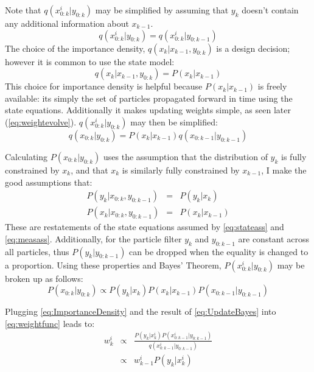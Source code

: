 \documentclass[journal]{./IEEEtran}
\begin{document}
Note that $q(x^i_{0:k} | y_{0:k})$ may be simplified by assuming that 
$y_k$ doesn't contain any additional information about $x_{k-1}$. 
\begin{equation}
q(x^i_{0:k} | y_{0:k}) = q(x^i_{0:k} | y_{0:k-1})
\label{eq:QAssump}
\end{equation}
The choice of the importance density, $q(x_k | x_{k-1}, y_{0:k})$ is 
a design decision; however it is common to use the state model: 
\begin{equation}
q(x_k | x_{k-1}, y_{0:k}) =  P(x_k | x_{k-1})
\label{eq:ImportanceDensity}
\end{equation}
This choice for importance density is helpful because 
$P(x_k | x_{k-1})$ is freely available: its simply the set 
of particles propagated forward in time using the state 
equations. Additionally it makes
updating weights simple, as seen later (\autoref{eq:weightevolve}).
$q(x^i_{0:k} | y_{0:k})$ may then be simplified:
\begin{equation}
q(x_{0:k} | y_{0:k}) = P(x_k | x_{k-1})q(x_{0:k-1} | y_{0:k-1})  
\label{eq:Support}
\end{equation}

Calculating $P(x_{0:k} | y_{0:k})$ 
uses the assumption that the distribution of $y_k$ is 
fully constrained by $x_k$, and that $x_k$ is similarly fully 
constrained by $x_{k-1}$, I make the good assumptions that:
\begin{eqnarray}
P(y_k | x_{0:k}, y_{0:k-1}) &=& P(y_k | x_k) \nonumber \\
P(x_k | x_{0:k}, y_{0:k-1}) &=& P(x_k | x_{k-1})
\label{eq:MarkovProperty}
\end{eqnarray}
These are restatements of the state equations assumed by \autoref{eq:stateass}
and \autoref{eq:measass}.
Additionally, for the particle filter $y_k$ and $y_{0:k-1}$ are 
constant across all particles, thus $P(y_k| y_{0:k-1})$ can
be dropped when the equality is changed to a proportion. 
Using these properties and Bayes' Theorem, $P(x^i_{0:k} | y_{0:k})$ 
may be broken up as follows:
\begin{equation}
P(x_{0:k} | y_{0:k}) \propto P(y_k| x_k) P(x_k | x_{k-1}) P(x_{0:k-1} | y_{0:k-1}) 
 \label{eq:UpdateBayes}
\end{equation}

Plugging \autoref{eq:ImportanceDensity} and the result of \autoref{eq:UpdateBayes}
into \autoref{eq:weightfunc} leads to:
\begin{eqnarray}
w^i_k & \propto & \frac{P(y_k| x^i_k)  P(x^i_{0:k-1} | y_{0:k-1})}
                         {q(x^i_{0:k-1} | y_{0:k-1})} \nonumber \\
& \propto & w^i_{k-1}P(y_k| x^i_k) 
\label{eq:weightevolve}
\end{eqnarray}
\end{document}
